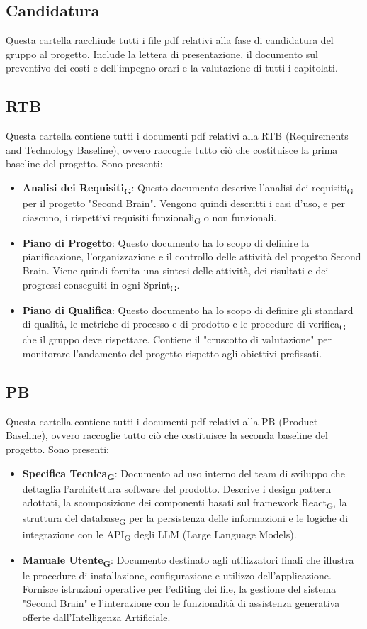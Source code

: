 \documentclass[11pt,a4paper]{article}
\newcommand{\gls}[1]{#1\textsubscript{G}}
\begin{document}
\subsection{Candidatura}
Questa cartella racchiude tutti i file pdf relativi alla fase di candidatura del gruppo al progetto. Include la lettera di presentazione, il documento sul preventivo dei costi e dell'impegno orari e la valutazione di tutti i capitolati.

\subsection{RTB}
Questa cartella contiene tutti i documenti pdf relativi alla RTB (Requirements and Technology Baseline), ovvero raccoglie tutto ciò che costituisce la prima baseline del progetto. Sono presenti:
\begin{itemize}
    \item \textbf{\gls{Analisi dei Requisiti}}: Questo documento descrive l'\gls{analisi dei requisiti} per il progetto "Second Brain". Vengono quindi descritti i casi d'uso, e per ciascuno, i rispettivi \gls{requisiti funzionali} o non funzionali.
    
    \item \textbf{Piano di Progetto}: Questo documento ha lo scopo di definire la pianificazione, l’organizzazione e il controllo delle attività del progetto Second Brain. Viene quindi fornita una sintesi delle attività, dei risultati e dei progressi conseguiti in ogni \gls{Sprint}.
    
    \item \textbf{Piano di Qualifica}: Questo documento ha lo scopo di definire gli standard di qualità, le metriche di processo e di prodotto e le procedure di \gls{verifica} che il gruppo deve rispettare. Contiene il "cruscotto di valutazione" per monitorare l'andamento del progetto rispetto agli obiettivi prefissati.
\end{itemize}


\subsection{PB}
Questa cartella contiene tutti i documenti pdf relativi alla PB (Product Baseline), ovvero raccoglie tutto ciò che costituisce la seconda baseline del progetto. Sono presenti:
\begin{itemize}
    \item \textbf{\gls{Specifica Tecnica}}: Documento ad uso interno del team di sviluppo che dettaglia l'architettura software del prodotto. Descrive i design pattern adottati, la scomposizione dei componenti basati sul framework \gls{React}, la struttura del \gls{database} per la persistenza delle informazioni e le logiche di integrazione con le \gls{API} degli LLM (Large Language Models).
    \item \textbf{\gls{Manuale Utente}}: Documento destinato agli utilizzatori finali che illustra le procedure di installazione, configurazione e utilizzo dell'applicazione. Fornisce istruzioni operative per l'editing dei file, la gestione del sistema "Second Brain" e l'interazione con le funzionalità di assistenza generativa offerte dall'Intelligenza Artificiale.
\end{itemize}
\end{document}
